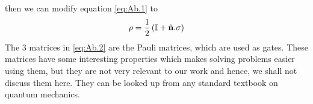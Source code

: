 then we can modify equation \ref{eq:Ab.1} to
\begin{equation*}
\rho=\frac{\displaystyle 1}{\displaystyle 2}\left(\mathbb{I}+\hat{\mathbf{n}}.\mathbf{\sigma}\right)
\end{equation*}
The 3 matrices in \ref{eq:Ab.2} are the Pauli matrices, which are used as gates. These matrices have some interesting properties which makes solving problems easier using them, but they are not very relevant to our work and hence, we shall not discuss them here. They can be looked up from any standard textbook on quantum mechanics\cite{shankar}.